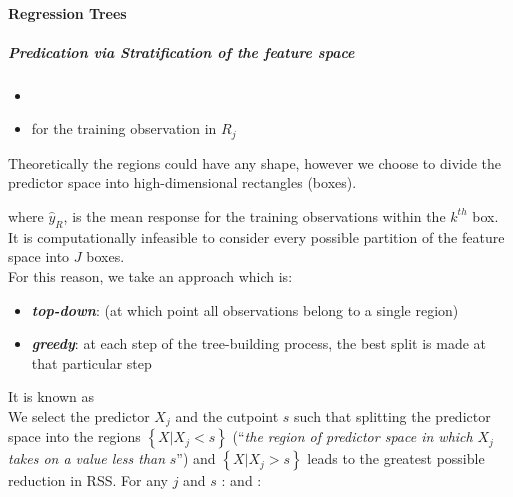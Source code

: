 \paragraph{Regression Trees}
\subparagraph{Predication via Stratification of the feature space }
\begin{itemize}
	\item {}
	\item {} for the training 
		observation in $R_{j}$
\end{itemize}
Theoretically the regions could have any shape, however we choose to
divide the predictor space into high-dimensional rectangles (boxes).
\begin{center}
\end{center}
where $\hat{y}_{R}$, is the mean response for the training observations
within the $k^{th}$ box.
It is computationally infeasible to consider every possible partition
of the feature space into $J$ boxes.\\
For this reason, we take an approach which is:
\begin{itemize}
	\item \textbf{\emph{top-down}}:  (at which point all observations belong to a 
		single region) 
	\item \textbf{\emph{greedy}}: at each step of the tree-building
		process, the best split is made at that particular step
\end{itemize}
It is known as \\

We select the predictor $X_{j}$ and the cutpoint $s$ such that 
splitting the predictor space into the regions $\left\{X|X_{j}<s\right\}$ (``\emph{the region of predictor space in which} $X_{j}$ \emph{takes
on a value less than} $s$'') and $\left\{X|X_{j}>s\right\}$ leads to the greatest possible 
reduction in RSS.
For any $j$ and $s$ :
and :

